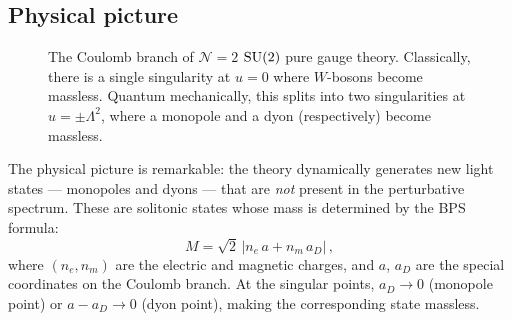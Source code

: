 \documentclass[11pt,a4paper]{article}
\begin{document}
\subsection{Physical picture}

\begin{figure}[ht]
\centering
{}
\caption{The Coulomb branch of $\mathcal{N}=2$ $\mathrm{SU}(2)$ pure gauge
theory.  Classically, there is a single singularity at $u = 0$ where
$W$-bosons become massless.  Quantum mechanically, this splits into two
singularities at $u = \pm\Lambda^2$, where a monopole and a dyon
(respectively) become massless.}
\label{fig:coulomb-branch}
\end{figure}

The physical picture is remarkable: the theory dynamically generates new
light states --- monopoles and dyons --- that are \emph{not} present in
the perturbative spectrum.  These are solitonic states whose mass is
determined by the BPS formula:
\begin{equation}\label{eq:BPS}
  M = \sqrt{2}\,|n_e\, a + n_m\, a_D|\,,
\end{equation}
where $(n_e, n_m)$ are the electric and magnetic charges, and $a$, $a_D$
are the special coordinates on the Coulomb branch.  At the singular
points, $a_D \to 0$ (monopole point) or $a - a_D \to 0$ (dyon point),
making the corresponding state massless.
\end{document}
